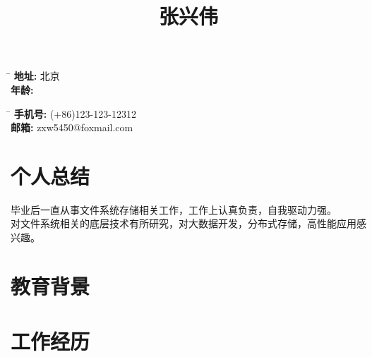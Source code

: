 \documentclass[10pt]{article} %
\begin{document}
\title{张兴伟}
\parbox{2pt}{
\begin{tabbing}
\hspace{1.5cm} \= \hspace{4cm} \kill %
\textbf{地址:} \>北京\\
\textbf{年龄:} 
\end{tabbing}
}
\hfill %
\parbox{2pt}{
\begin{tabbing}
\hspace{1.5cm} \= \hspace{4cm} \kill %
\textbf{手机号:} \>(+86)123-123-12312\\ 
\textbf{邮箱:} \>zxw5450@foxmail.com
\end{tabbing}
}

\section{个人总结}
毕业后一直从事文件系统存储相关工作，工作上认真负责，自我驱动力强。\\对文件系统相关的底层技术有所研究，对大数据开发，分布式存储，高性能应用感兴趣。
\section{教育背景}
\section{工作经历}
\end{document}
